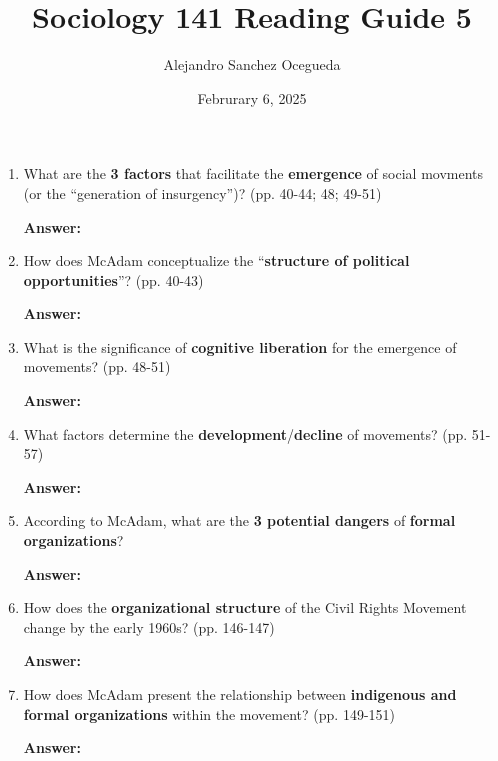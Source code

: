\documentclass{article}
\title{Sociology 141 Reading Guide 5}
\author{Alejandro Sanchez Ocegueda}
\date{Februrary 6, 2025}
\newcommand{\answer}{\textbf{Answer:}$\;$}
\begin{document}
\maketitle

\begin{enumerate}[label=\arabic*)]
    \item What are the \textbf{3 factors} that facilitate the \textbf{emergence} of social movments (or the ``generation of insurgency'')? (pp. 40-44; 48; 49-51)
    
    \answer 
    
    \item How does McAdam conceptualize the ``\textbf{structure of political opportunities}''? (pp. 40-43)
    
    \answer 
    
    
    \item What is the significance of \textbf{cognitive liberation} for the emergence of movements? (pp. 48-51) 
   

    \answer
    
    \item What factors determine the \textbf{development}/\textbf{decline} of movements? (pp. 51-57)
    
    \answer 
    
    \item According to McAdam, what are the \textbf{3 potential dangers} of \textbf{formal organizations}?
    
    \answer
    

    \item How does the \textbf{organizational structure} of the Civil Rights Movement change by the early 1960s? (pp. 146-147)
    
    \answer
    
    \item How does McAdam present the relationship between \textbf{indigenous and formal organizations} within the movement? (pp. 149-151)
    
    \answer
    
\end{enumerate}
 
\end{document}
